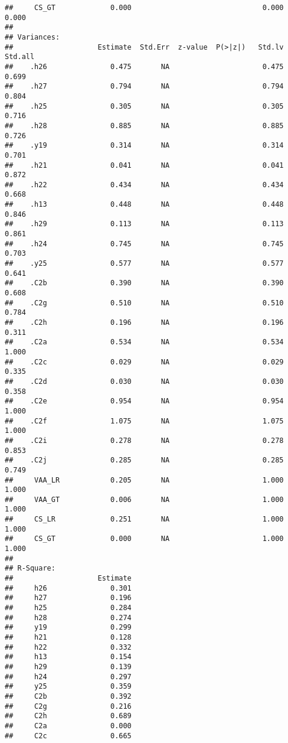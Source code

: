 \documentclass[
]{article}
\begin{document}
\begin{verbatim}
##     CS_GT             0.000                               0.000    0.000
## 
## Variances:
##                    Estimate  Std.Err  z-value  P(>|z|)   Std.lv  Std.all
##    .h26               0.475       NA                      0.475    0.699
##    .h27               0.794       NA                      0.794    0.804
##    .h25               0.305       NA                      0.305    0.716
##    .h28               0.885       NA                      0.885    0.726
##    .y19               0.314       NA                      0.314    0.701
##    .h21               0.041       NA                      0.041    0.872
##    .h22               0.434       NA                      0.434    0.668
##    .h13               0.448       NA                      0.448    0.846
##    .h29               0.113       NA                      0.113    0.861
##    .h24               0.745       NA                      0.745    0.703
##    .y25               0.577       NA                      0.577    0.641
##    .C2b               0.390       NA                      0.390    0.608
##    .C2g               0.510       NA                      0.510    0.784
##    .C2h               0.196       NA                      0.196    0.311
##    .C2a               0.534       NA                      0.534    1.000
##    .C2c               0.029       NA                      0.029    0.335
##    .C2d               0.030       NA                      0.030    0.358
##    .C2e               0.954       NA                      0.954    1.000
##    .C2f               1.075       NA                      1.075    1.000
##    .C2i               0.278       NA                      0.278    0.853
##    .C2j               0.285       NA                      0.285    0.749
##     VAA_LR            0.205       NA                      1.000    1.000
##     VAA_GT            0.006       NA                      1.000    1.000
##     CS_LR             0.251       NA                      1.000    1.000
##     CS_GT             0.000       NA                      1.000    1.000
## 
## R-Square:
##                    Estimate
##     h26               0.301
##     h27               0.196
##     h25               0.284
##     h28               0.274
##     y19               0.299
##     h21               0.128
##     h22               0.332
##     h13               0.154
##     h29               0.139
##     h24               0.297
##     y25               0.359
##     C2b               0.392
##     C2g               0.216
##     C2h               0.689
##     C2a               0.000
##     C2c               0.665

\end{verbatim}
\end{document}
